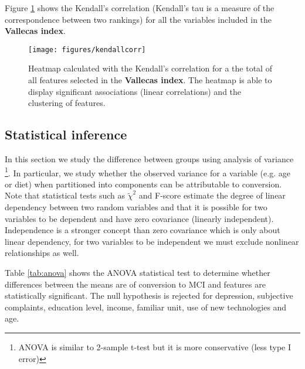 \documentclass[11pt]{article}
\theoremstyle{definition}
\theoremstyle{remark}
\begin{document}
Figure \ref{fig:kendall} shows the Kendall's correlation (Kendall’s tau is a measure of the correspondence between two rankings) 
for all the variables included in the \textbf{Vallecas index}.

\begin{figure}[H]
        \centering
        \texttt{[image: figures/kendallcorr]}
        \caption{Heatmap calculated with the Kendall's correlation for a the total of all features selected in the \textbf{Vallecas index}. The heatmap is able to display significant associations (linear correlations) and the clustering of features.} \label{fig:kendall}
\end{figure}

\subsection{Statistical inference}
\label{sse:satinf}
In this section we study the difference between groups using analysis of variance \footnote{ANOVA is similar to 2-sample t-test but it is more conservative (less type I error)}. In particular, we study whether the observed variance for a variable (e.g. age or diet) when partitioned into components can be attributable to conversion. Note that statistical tests such as $\tilde{\chi}^2$ and F-score estimate the degree of linear dependency between two random variables and that it is possible for two variables to be dependent and have zero covariance (linearly independent). Independence is a stronger concept than zero covariance which is only about linear dependency, for two variables to be independent we must exclude nonlinear relationships as well.%

Table \ref{tab:anova} shows the ANOVA statistical test to determine whether differences between the means are of conversion to MCI and features are statistically significant. The null hypothesis is rejected for depression, subjective complaints, education level, income, familiar unit, use of new technologies and age. 
\end{document}
